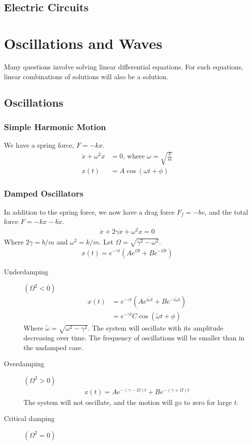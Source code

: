 \documentclass[11pt, letterpaper]{article}
\begin{document}
\begin{multicols*}{3}
\subsection{Electric Circuits}

\section{Oscillations and Waves}
Many questions involve solving linear differential equations. For such equations, linear combinations of solutions will also be a solution.
\subsection{Oscillations}
\subsubsection{Simple Harmonic Motion}
We have a spring force, $F=-kx$.
\begin{align*}
  \ddot{x}+\omega^2x&=0 \text{, where }\omega=\sqrt{\frac{k}{m}}\\
  x(t)&=A \cos(\omega t+\phi)
\end{align*}
\subsubsection{Damped Oscillators}
In addition to the spring force, we now have a drag force $F_f=-bv$, and the total force $F=-kx-b\dot{x}$.
\begin{align*}
  \ddot{x} + 2\gamma\dot{x}+\omega^2x=0
\end{align*}
Where $2\gamma=b/m$ and $\omega^2=k/m$. Let $\Omega = \sqrt{\gamma^2-\omega^2}$.
\begin{align*}
  x(t)=e^{-\gamma t}(Ae^{\Omega t}+Be^{-\Omega t})
\end{align*}
\begin{description}
\item [Underdamping] $(\Omega^2<0)$
  \begin{align*}
    x(t)&=e^{-\gamma t}(Ae^{i\tilde{\omega}t}+Be^{-i\tilde{\omega}t})\\
    &=e^{-\gamma t}C\cos(\tilde{\omega}t + \phi)
  \end{align*}
  Where $\tilde{\omega}=\sqrt{\omega^2-\gamma^2}$. The system will oscillate with its amplitude decreasing over time. The frequency of oscillations will be smaller than in the undamped case.
\item[Overdamping] $(\Omega^2>0)$
  \begin{align*}
    x(t)=Ae^{-(\gamma-\Omega)t}+Be^{-(\gamma+\Omega)t}
  \end{align*}
  The system will not oscillate, and the motion will go to zero for large $t$.
\item[Critical damping] $(\Omega^2=0)$


\end{description}
\end{multicols*}
\end{document}
